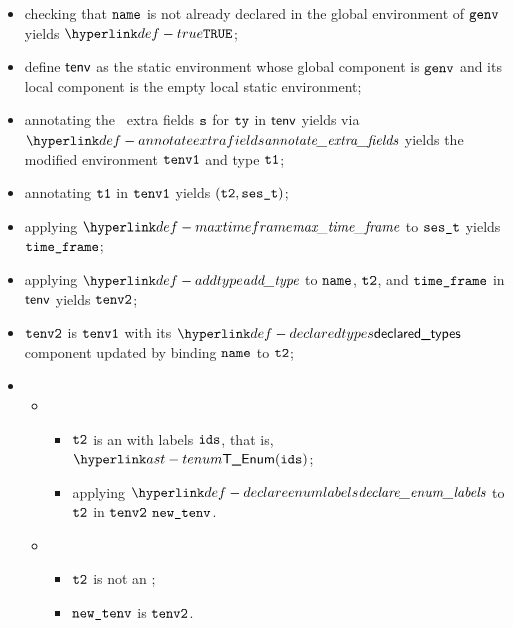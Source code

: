 \ProseParagraph
\AllApply
\begin{itemize}
  \item checking that $\texttt{name}$ is not already declared in the global environment of $\texttt{genv}$ yields $\True$\ProseOrTypeError;
  \item define $\textsf{tenv}$ as the static environment whose global component is $\texttt{genv}$ and its local component is the empty local
        static environment;
  \item annotating the \optional\ extra fields $\texttt{s}$ for $\texttt{ty}$ in $\textsf{tenv}$ yields via \\ $\annotateextrafields$
        yields the modified environment $\texttt{tenv1}$ and type $\texttt{t1}$\ProseOrTypeError;
  \item annotating $\texttt{t1}$ in $\texttt{tenv1}$ yields $(\texttt{t2}, \texttt{ses\_t})$\ProseOrTypeError;
  \item applying $\maxtimeframe$ to $\texttt{ses\_t}$ yields $\texttt{time\_frame}$;
  \item applying $\addtype$ to $\texttt{name}$, $\texttt{t2}$, and $\texttt{time\_frame}$ in $\textsf{tenv}$ yields $\texttt{tenv2}$;
  \item $\texttt{tenv2}$ is $\texttt{tenv1}$ with its $\declaredtypes$ component updated by binding $\texttt{name}$ to $\texttt{t2}$;
  \item \OneApplies
  \begin{itemize}
    \item {}
    \begin{itemize}
      \item $\texttt{t2}$ is an \enumerationtypeterm{} with labels $\texttt{ids}$, that is, $\TEnum(\ids)$;
      \item applying $\declareenumlabels$ to $\texttt{t2}$ in $\texttt{tenv2}$ $\texttt{new\_tenv}$\ProseOrTypeError.
    \end{itemize}

    \item {}
    \begin{itemize}
      \item $\texttt{t2}$ is not an \enumerationtypeterm{};
      \item $\texttt{new\_tenv}$ is $\texttt{tenv2}$.
    \end{itemize}
  \end{itemize}
\end{itemize}

